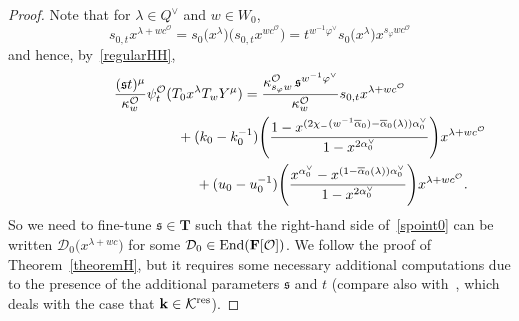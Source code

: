 \documentclass[11pt]{article}
\numberwithin{equation}{section}
\numberwithin{equation}{section}
\begin{document}
\begin{proof}
Note that for $\lambda\in Q^\vee$ and $w\in W_0$,
\begin{equation*}
s_{0,t}x^{\lambda+wc^\mathcal{O}}=s_0\bigl(x^\lambda\bigr)\bigl(s_{0,t}x^{wc^\mathcal{O}}\bigr)=t^{w^{-1}\varphi^\vee}s_0\bigl(x^\lambda\bigr)x^{s_\varphi wc^\mathcal{O}}
\end{equation*}
and hence, by~\eqref{regularHH},
\begin{gather}
\frac{(\mathfrak{s}t)^\mu}{\kappa_w^\mathcal{O}}\psi_{t}^\mathcal{O}(T_0x^\lambda T_wY^\mu)=\frac{\kappa_{s_\varphi w}^\mathcal{O}\,\mathfrak{s}^{w^{-1}\varphi^\vee}}{\kappa_w^\mathcal{O}}s_{0,t}x^{\lambda+wc^\mathcal{O}}\nonumber\\
\hphantom{\frac{(\mathfrak{s}t)^\mu}{\kappa_w^\mathcal{O}}\psi_{t}^\mathcal{O}(T_0x^\lambda T_wY^\mu)=}{}
+(k_0-k_0^{-1})\Biggl(\frac{1-x^{(2\chi_-(w^{-1}\overline{\alpha}_0)-\overline{\alpha}_0(\lambda))\alpha_0^\vee}}{1-x^{2\alpha_0^\vee}}\Biggr)x^{\lambda+wc^\mathcal{O}}\nonumber\\
\hphantom{\frac{(\mathfrak{s}t)^\mu}{\kappa_w^\mathcal{O}}\psi_{t}^\mathcal{O}(T_0x^\lambda T_wY^\mu)=}{}
+(u_0-u_0^{-1})\Biggl(\frac{x^{\alpha_0^\vee}-x^{(1-\overline{\alpha}_0(\lambda))\alpha_0^\vee}}{1-x^{2\alpha_0^\vee}}\Biggr)x^{\lambda+wc^\mathcal{O}}.
\label{spoint0}
\end{gather}
So we need to fine-tune $\mathfrak{s}\in\mathbf{T}$ such that the right-hand side of~\eqref{spoint0} can be written
$\mathcal{D}_0\bigl(x^{\lambda+wc}\bigr)$ for
some $\mathcal{D}_0\in\textup{End}(\mathbf{F}[\mathcal{O}])$.
We follow the proof of Theorem~\ref{theoremH}, but it requires some necessary additional computations due to the presence of the additional parameters $\mathfrak{s}$ and $t$ (compare also with~\cite[Section~5]{SSV2}, which deals with the case that $\mathbf{k}\in\mathcal{K}^{{\rm res}}$).


\end{proof}
\end{document}
